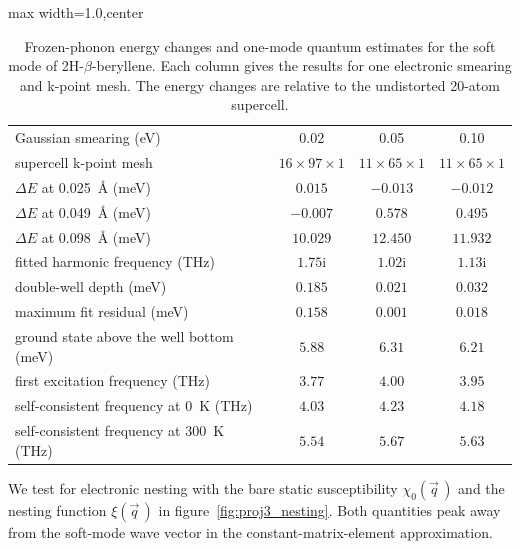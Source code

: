 \begin{table}[!htbp]
\centering
{}
\begin{adjustbox}{max width=1.0\linewidth,center}
\begin{tabular}{lccc}
\hline
\rowcolor{gray!25}
Gaussian smearing (eV) & 0.02 & 0.05 & 0.10 \\
supercell k-point mesh & $16 \times 97 \times 1$ & $11 \times 65 \times 1$ & $11 \times 65 \times 1$ \\
\hline
$\Delta E$ at \qty{0.025}{\angstrom} (meV) & $0.015$ & $-0.013$ & $-0.012$ \\
$\Delta E$ at \qty{0.049}{\angstrom} (meV) & $-0.007$ & $0.578$ & $0.495$ \\
$\Delta E$ at \qty{0.098}{\angstrom} (meV) & $10.029$ & $12.450$ & $11.932$ \\
fitted harmonic frequency (THz) & $1.75\mathrm{i}$ & $1.02\mathrm{i}$ & $1.13\mathrm{i}$ \\
double-well depth (meV) & $0.185$ & $0.021$ & $0.032$ \\
maximum fit residual (meV) & $0.158$ & $0.001$ & $0.018$ \\
\hline
ground state above the well bottom (meV) & $5.88$ & $6.31$ & $6.21$ \\
first excitation frequency (THz) & $3.77$ & $4.00$ & $3.95$ \\
self-consistent frequency at \qty{0}{\kelvin} (THz) & $4.03$ & $4.23$ & $4.18$ \\
self-consistent frequency at \qty{300}{\kelvin} (THz) & $5.54$ & $5.67$ & $5.63$ \\
\hline
\end{tabular}
\end{adjustbox}
\caption{Frozen-phonon energy changes and one-mode quantum estimates for the soft mode of 2H-$\beta$-beryllene.
Each column gives the results for one electronic smearing and k-point mesh.
The energy changes are relative to the undistorted 20-atom supercell.}
\label{tab:proj3_soft_mode}
\end{table}

We test for electronic nesting with the bare static susceptibility $\chi_0(\vec{q}\,)$ and the nesting function $\xi(\vec{q}\,)$ in figure~\ref{fig:proj3_nesting}.
Both quantities peak away from the soft-mode wave vector in the constant-matrix-element approximation.

